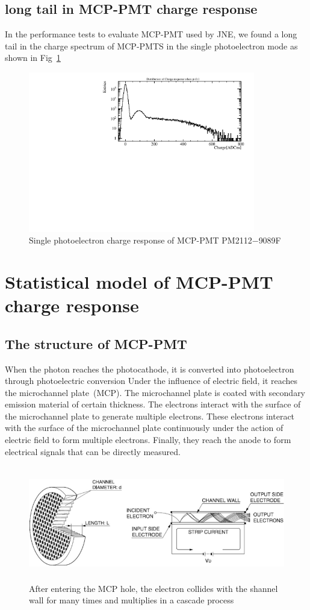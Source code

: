 \documentclass{article}
\begin{document}
\subsection{long tail in MCP-PMT charge response}\label{subsec:tail}
In the performance tests to evaluate MCP-PMT used by JNE, we found a long tail in the charge spectrum of MCP-PMTS in the single photoelectron mode as shown in Fig~\ref{fig:tail}
\begin{figure}[ht]
    \centering
    \includegraphics[height=7cm]{pic/longtail.pdf}
    \caption{Single photoelectron charge response of MCP-PMT PM2112$-$9089F}\label{fig:tail}
\end{figure}
\section{Statistical model of MCP-PMT charge response}
\subsection{The structure of MCP-PMT}\label{subsec:structure}
When the photon reaches the photocathode, it is converted into photoelectron through photoelectric conversion
Under the influence of electric field, it reaches the microchannel plate~(MCP). The microchannel plate is coated
with secondary emission material of certain thickness. The electrons interact with the surface of the microchannel plate to generate multiple electrons. 
These electrons interact with the surface of the microchannel plate continuously under the action of electric field to form multiple electrons.
Finally, they reach the anode to form electrical signals that can be directly measured.
\begin{figure}[ht]
    \centering
    \includegraphics[height=5cm]{pic/structure.pdf}
    \caption{After entering the MCP hole, the electron collides with the shannel wall for many times and multiplies in a cascade process}\label{fig:structure}
\end{figure}
\end{document}
